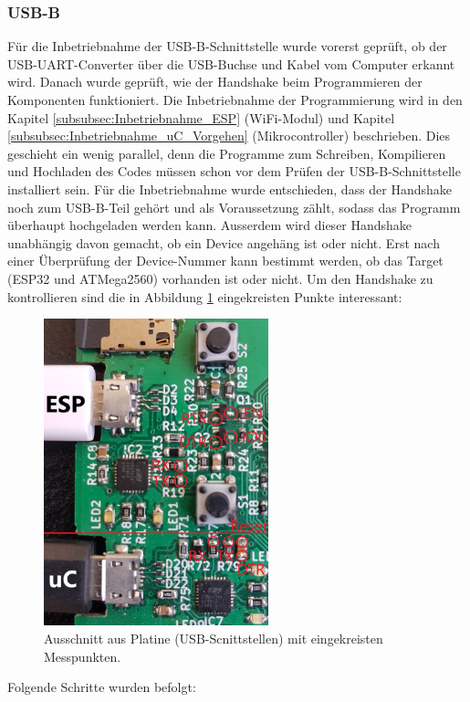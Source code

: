 \subsubsection{USB-B}
\label{subsubsec:Inbetriebnahme_USB-B}

Für die Inbetriebnahme der USB-B-Schnittstelle wurde vorerst geprüft, ob der USB-UART-Converter über die USB-Buchse und Kabel vom Computer erkannt wird. Danach wurde geprüft, wie der Handshake beim Programmieren der Komponenten funktioniert. Die Inbetriebnahme der Programmierung wird in den Kapitel \ref{subsubsec:Inbetriebnahme_ESP} (WiFi-Modul) und Kapitel \ref{subsubsec:Inbetriebnahme_uC_Vorgehen} (Mikrocontroller) beschrieben. Dies geschieht ein wenig parallel, denn die Programme zum Schreiben, Kompilieren und Hochladen des Codes müssen schon vor dem Prüfen der USB-B-Schnittstelle installiert sein. Für die Inbetriebnahme wurde entschieden, dass der Handshake noch zum USB-B-Teil gehört und als Voraussetzung zählt, sodass das Programm überhaupt hochgeladen werden kann. Ausserdem wird dieser Handshake unabhängig davon gemacht, ob ein Device angehäng ist oder nicht. Erst nach einer Überprüfung der Device-Nummer kann bestimmt werden, ob das Target (ESP32 und ATMega2560) vorhanden ist oder nicht. Um den Handshake zu kontrollieren sind die in Abbildung \ref{fig:USB_B_Print} eingekreisten Punkte interessant:


\begin{figure}[h!]
\center
\includegraphics[width = 0.58\textwidth]{graphics/USB_B_Print}
\caption{Ausschnitt aus Platine (USB-Scnittstellen) mit eingekreisten Messpunkten.}
\label{fig:USB_B_Print}
\end{figure}
\newpage
Folgende Schritte wurden befolgt:

